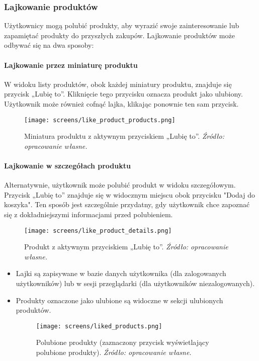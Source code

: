 \documentclass[12pt,a4paper,oneside]{article}
\theoremstyle{definition}
\numberwithin{equation}{section}
\begin{document}
\newpage
\subsubsection{Lajkowanie produktów}
Użytkownicy mogą polubić produkty, aby wyrazić swoje zainteresowanie lub zapamiętać produkty do przyszłych zakupów. Lajkowanie produktów może odbywać się na dwa sposoby:

\paragraph{Lajkowanie przez miniaturę produktu}
W widoku listy produktów, obok każdej miniatury produktu, znajduje się przycisk „Lubię to”. Kliknięcie tego przycisku oznacza produkt jako ulubiony. Użytkownik może również cofnąć lajka, klikając ponownie ten sam przycisk.

\begin{figure}[H]
    \centering
    \texttt{[image: screens/like\_product\_products.png]}
    \caption{Miniatura produktu z aktywnym przyciskiem „Lubię to”. \emph{Źródło: opracowanie własne.}}
    \label{fig:like_button_miniature}
\end{figure}

\paragraph{Lajkowanie w szczegółach produktu}
Alternatywnie, użytkownik może polubić produkt w widoku szczegółowym. Przycisk „Lubię to” znajduje się w widocznym miejscu obok przycisku "Dodaj do koszyka". Ten sposób jest szczególnie przydatny, gdy użytkownik chce zapoznać się z dokładniejszymi informacjami przed polubieniem.
\begin{figure}[H]
    \centering
    \texttt{[image: screens/like\_product\_details.png]}
    \caption{Produkt z aktywnym przyciskiem „Lubię to”. \emph{Źródło: opracowanie własne.}}
    \label{fig:like_button_details}
\end{figure}
\begin{itemize}
    \item Lajki są zapisywane w bazie danych użytkownika (dla zalogowanych użytkowników) lub w sesji przeglądarki (dla użytkowników niezalogowanych).
    \item Produkty oznaczone jako ulubione są widoczne w sekcji ulubionych produktów.
    \begin{figure}[H]
        \centering
        \texttt{[image: screens/liked\_products.png]}
        \caption{Polubione produkty (zaznaczony przycisk wyświetlający polubione produkty). \emph{Źródło: opracowanie własne.}}
        \label{fig:liked_products}
    \end{figure}
\end{itemize}
\end{document}
